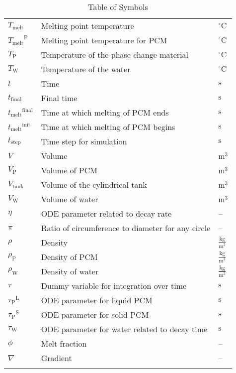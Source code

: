 \documentclass[12pt]{article}
\begin{document}
\begin{longtabu}{l X[l] l}
\\
${T_{\text{melt}}}$ & Melting point temperature & ${{}^{\circ}\text{C}}$
\\
${{T_{\text{melt}}}^{\text{P}}}$ & Melting point temperature for PCM & ${{}^{\circ}\text{C}}$
\\
${T_{\text{P}}}$ & Temperature of the phase change material & ${{}^{\circ}\text{C}}$
\\
${T_{\text{W}}}$ & Temperature of the water & ${{}^{\circ}\text{C}}$
\\
$t$ & Time & ${\text{s}}$
\\
${t_{\text{final}}}$ & Final time & ${\text{s}}$
\\
${{t_{\text{melt}}}^{\text{final}}}$ & Time at which melting of PCM ends & ${\text{s}}$
\\
${{t_{\text{melt}}}^{\text{init}}}$ & Time at which melting of PCM begins & ${\text{s}}$
\\
${t_{\text{step}}}$ & Time step for simulation & ${\text{s}}$
\\
$V$ & Volume & ${\text{m}^{3}}$
\\
${V_{\text{P}}}$ & Volume of PCM & ${\text{m}^{3}}$
\\
${V_{\text{tank}}}$ & Volume of the cylindrical tank & ${\text{m}^{3}}$
\\
${V_{\text{W}}}$ & Volume of water & ${\text{m}^{3}}$
\\
$η$ & ODE parameter related to decay rate & --
\\
$π$ & Ratio of circumference to diameter for any circle & --
\\
$ρ$ & Density & $\frac{\text{kg}}{\text{m}^{3}}$
\\
${ρ_{\text{P}}}$ & Density of PCM & $\frac{\text{kg}}{\text{m}^{3}}$
\\
${ρ_{\text{W}}}$ & Density of water & $\frac{\text{kg}}{\text{m}^{3}}$
\\
$τ$ & Dummy variable for integration over time & ${\text{s}}$
\\
${{τ_{\text{P}}}^{\text{L}}}$ & ODE parameter for liquid PCM & ${\text{s}}$
\\
${{τ_{\text{P}}}^{\text{S}}}$ & ODE parameter for solid PCM & ${\text{s}}$
\\
${τ_{\text{W}}}$ & ODE parameter for water related to decay time & ${\text{s}}$
\\
$ϕ$ & Melt fraction & --
\\
$∇$ & Gradient & --
\\
\bottomrule
\caption{Table of Symbols}
\label{Table:ToS}
\end{longtabu}
\end{document}
